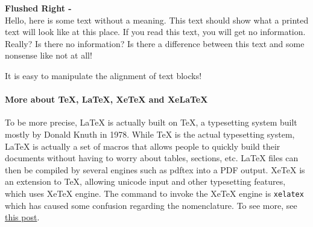 \documentclass[a4paper]{qgabe-worksheet}
\begin{document}
\flushright
\textbf{Flushed Right -  }\\
Hello, here is some text without a meaning. This text should show what a printed text will look like at this place. If you read this text, you will get no information. Really? Is there no information? Is there a difference between this text and some nonsense like not at all!
\linebreak

\flushleft
It is easy to manipulate the alignment of text blocks! 

\paragraph{More about \TeX{}, \LaTeX{}, XeTeX and XeLaTeX}
\flushleft
To be more precise, \LaTeX{} is actually built on \TeX{}, a typesetting system built mostly by Donald Knuth in 1978. While TeX is the actual typesetting system, LaTeX is actually a set of macros that allows people to quickly build their documents without having to worry about tables, sections, etc. LaTeX files can then be compiled by several engines such as pdftex into a PDF output. XeTeX is an extension to TeX, allowing unicode input and other typesetting features, which uses XeTeX engine. The command to invoke the XeTeX engine is \texttt{xelatex} which has caused some confusion regarding the nomenclature. To see more, see \href{https://tex.stackexchange.com/questions/296616/questions-regarding-the-distinction-between-xetex-and-xelatex-and-how-they-relat}{this post}.

\flushleft

\newpage{} %
\end{document}
